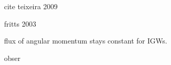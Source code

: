 cite teixeira 2009





fritts 2003

flux of angular momentum stays constant for IGWs.

\textcite[]{kruse_midlatitude_2016} obser

\textcite[]{kruse_gravity_2015} 




